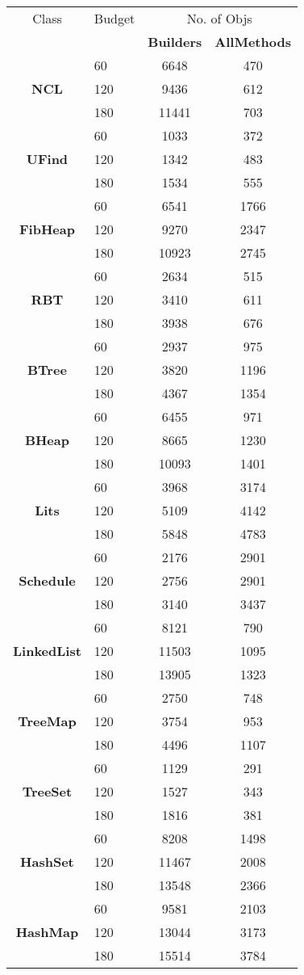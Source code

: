 \begin{table}[t!]
\centering
\scriptsize
\begin{tabular}{ c l c c}
\hline
Class & Budget &
\multicolumn{2}{c}{\textsf{No. of Objs}} \\
&& \tiny{\textbf{Builders}} & \tiny{\textbf{AllMethods}} \\
\hline
\multirow{3}{*}{\textbf{NCL}} 
&	60	&	6648	&	470	\\
&	120	&	9436	&	612	\\
&	180	&	11441	&	703	\\
\hline
\multirow{3}{*}{\textbf{UFind}} 
&	60	&	1033	&	372	\\
&	120	&	1342	&	483	\\
&	180	&	1534	&	555	\\
\hline
\multirow{3}{*}{\textbf{FibHeap}}
&	60	&	6541	&	1766	\\
&	120	&	9270	&	2347	\\
&	180	&	10923	&	2745	\\
\hline
\multirow{3}{*}{\textbf{RBT}}
&	60	&	2634	&	515	\\
&	120	&	3410	&	611	\\
&	180	&	3938	&	676	\\
\hline
\multirow{3}{*}{\textbf{BTree}}
&	60	&	2937	&	975	\\
&	120	&	3820	&	1196	\\
&	180	&	4367	&	1354	\\
\hline
\multirow{3}{*}{\textbf{BHeap}}
&	60	&	6455	&	971	\\
&	120	&	8665	&	1230	\\
&	180	&	10093	&	1401	\\
\hline
\multirow{3}{*}{\textbf{Lits}}
&	60	&	3968	&	3174	\\
&	120	&	5109	&	4142	\\
&	180	&	5848	&	4783	\\
\hline
\multirow{3}{*}{\textbf{Schedule}}
&	60	&	2176	&	2901	\\
&	120	&	2756	&	2901	\\
&	180	&	3140	&	3437	\\
\hline
\multirow{3}{*}{\textbf{LinkedList}} 
&	60	&	8121	&	790	\\
&	120	&	11503	&	1095	\\
&	180	&	13905	&	1323	\\
\hline
\multirow{3}{*}{\textbf{TreeMap}} 
&	60	&	2750	&	748	\\
&	120	&	3754	&	953	\\
&	180	&	4496	&	1107	\\
\hline\multirow{3}{*}{\textbf{TreeSet}}
&	60	&	1129	&	291	\\
&	120	&	1527	&	343	\\
&	180	&	1816	&	381	\\
\hline
\multirow{3}{*}{\textbf{HashSet}}
&	60	&	8208	&	1498	\\
&	120	&	11467	&	2008	\\
&	180	&	13548	&	2366	\\
\hline
\multirow{3}{*}{\textbf{HashMap}}
&	60	&	9581	&	2103	\\
&	120	&	13044	&	3173	\\
&	180	&	15514	&	3784	\\
\hline


\end{tabular}
\end{table}
